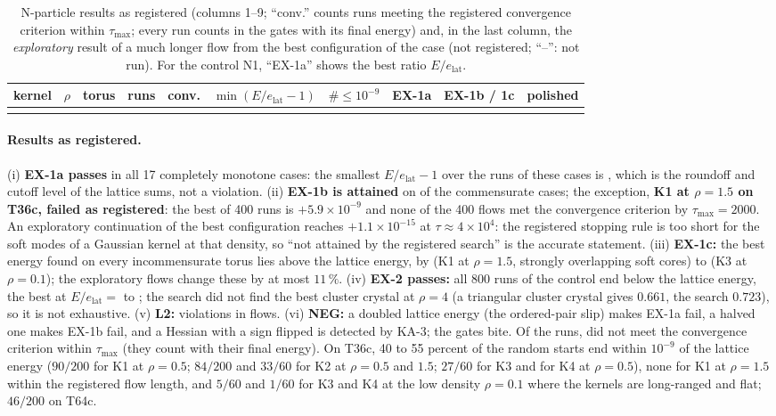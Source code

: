 \documentclass[11pt,a4paper]{article}
\newcommand{\elat}{e_{\mathrm{lat}}}
\begin{document}
\begin{table}[ht]\centering\scriptsize
\begin{tabular}{@{}lrlrrrrllr@{}}
\toprule
kernel & $\rho$ & torus & runs & conv. & $\min(E/\elat-1)$ & $\#\le10^{-9}$ & EX-1a & EX-1b / 1c & polished\\
\midrule
\\
\bottomrule
\end{tabular}
\caption{N-particle results as registered (columns 1--9; ``conv.'' counts runs meeting the registered convergence criterion within
$\tau_{\max}$; every run counts in the gates with its final energy) and, in the last column, the \emph{exploratory} result of
a much longer flow from the best configuration of the case (not registered; ``--'': not run). For the control N1, ``EX-1a''
shows the best ratio $E/\elat$.}
\end{table}

\paragraph{Results as registered.} (i) \textbf{EX-1a passes} in all 17 completely monotone cases: the smallest
$E/\elat-1$ over the \NRunsCM{} runs of these cases is \NMinRatio{}, which is the roundoff and cutoff level of the lattice sums, not a
violation. (ii) \textbf{EX-1b is attained} on \NCommAttained{} of the \NCommTotal{} commensurate cases; the exception,
\textbf{K1 at $\rho=1.5$ on T36c, failed as registered}: the best of 400 runs is $+5.9\times10^{-9}$ and none of the 400
flows met the convergence criterion by $\tau_{\max}=2000$. An exploratory continuation of the best configuration reaches
$+1.1\times10^{-15}$ at $\tau\approx4\times10^{4}$: the registered stopping rule is too short for the soft modes of a
Gaussian kernel at that density, so ``not attained by the registered search'' is the accurate statement. (iii) \textbf{EX-1c:}
the best energy found on every incommensurate torus lies above the lattice energy, by \NFrusMin{} (K1 at $\rho=1.5$,
strongly overlapping soft cores) to \NFrusMax{} (K3 at $\rho=0.1$); the exploratory flows change these by at most $11\,\%$. (iv) \textbf{EX-2 passes:} all 800 runs
of the control end below the lattice energy, the best at $E/\elat=$ \NNoneBest{} to \NNoneWorst{}; the search did not find
the best cluster crystal at $\rho=4$ (a triangular cluster crystal gives $0.661$, the search $0.723$), so it is not exhaustive.
(v) \textbf{L2:} \NLtwoViol{} violations in \NRuns{} flows. (vi) \textbf{NEG:} a doubled lattice energy (the ordered-pair slip)
makes EX-1a fail, a halved one makes EX-1b fail, and a Hessian with a sign flipped is detected by KA-3; the gates bite.
Of the \NRuns{} runs, \NNotConv{} did not meet the convergence criterion within $\tau_{\max}$ (they count with their final energy).
On T36c, 40 to 55 percent of the random starts end within $10^{-9}$ of the lattice energy ($90/200$ for K1 at $\rho=0.5$; $84/200$ and
$33/60$ for K2 at $\rho=0.5$ and $1.5$; $27/60$ for K3 and for K4 at $\rho=0.5$), none for K1 at $\rho=1.5$ within the registered flow length,
and $5/60$ and $1/60$ for K3 and K4 at the low density $\rho=0.1$ where the kernels are long-ranged and flat; $46/200$ on T64c.
\end{document}
